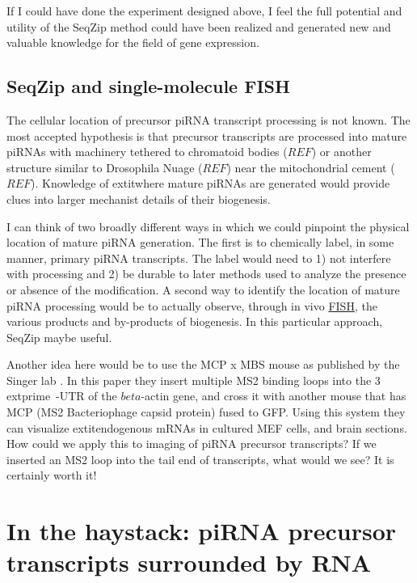     If I could have done the experiment designed above, I feel the full potential and utility of the SeqZip method could have been realized and generated new and valuable knowledge for the field of gene expression.

  \subsection{SeqZip and single-molecule FISH}

    The cellular location of precursor piRNA transcript processing is not known. The most accepted hypothesis is that precursor transcripts are processed into mature piRNAs with machinery tethered to chromatoid bodies ($REF$) or another structure similar to Drosophila Nuage ($REF$) near the mitochondrial cement ($REF$). Knowledge of   extit{where} mature piRNAs are generated would provide clues into larger mechanist details of their biogenesis. 

    I can think of two broadly different ways in which we could pinpoint the physical location of mature piRNA generation. The first is to chemically label, in some manner, primary piRNA transcripts. The label would need to 1) not interfere with processing and 2) be durable to later methods used to analyze the presence or absence of the modification. A second way to identify the location of mature piRNA processing would be to actually observe, through in vivo \hyperref[hd:abrevs]{FISH}, the various products and by-products of biogenesis. In this particular approach, SeqZip maybe useful.

    Another idea here would be to use the MCP x MBS mouse as published by the Singer lab \citep{Park2014}. In this paper they insert multiple MS2 binding loops into the 3  extprime~-UTR of the $beta$-actin gene, and cross it with another mouse that has MCP (MS2 Bacteriophage capsid protein) fused to GFP. Using this system they can visualize   extit{endogenous} mRNAs in cultured MEF cells, and brain sections. How could we apply this to imaging of piRNA precursor transcripts? If we inserted an MS2 loop into the tail end of transcripts, what would we see? It is certainly worth it!

\section{In the haystack: piRNA precursor transcripts surrounded by RNA}

